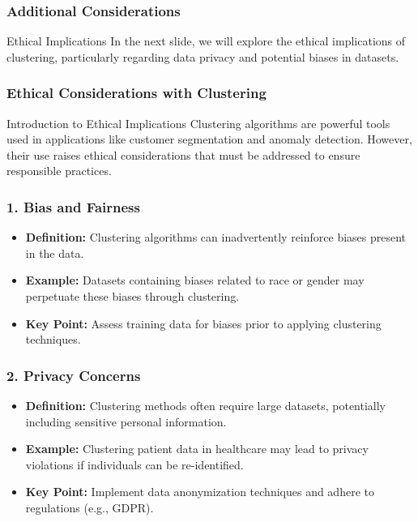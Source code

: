 \documentclass[aspectratio=169]{beamer}
\begin{document}
\begin{frame}[fragile]
    \frametitle{Additional Considerations}
    \begin{block}{Ethical Implications}
        In the next slide, we will explore the ethical implications of clustering, particularly regarding data privacy and potential biases in datasets.
    \end{block}
\end{frame}

\begin{frame}[fragile]
    \frametitle{Ethical Considerations with Clustering}
    \begin{block}{Introduction to Ethical Implications}
        Clustering algorithms are powerful tools used in applications like customer segmentation and anomaly detection. 
        However, their use raises ethical considerations that must be addressed to ensure responsible practices.
    \end{block}
\end{frame}

\begin{frame}[fragile]
    \frametitle{1. Bias and Fairness}
    \begin{itemize}
        \item \textbf{Definition:} Clustering algorithms can inadvertently reinforce biases present in the data.
        \item \textbf{Example:} Datasets containing biases related to race or gender may perpetuate these biases through clustering.
        \item \textbf{Key Point:} Assess training data for biases prior to applying clustering techniques.
    \end{itemize}
\end{frame}

\begin{frame}[fragile]
    \frametitle{2. Privacy Concerns}
    \begin{itemize}
        \item \textbf{Definition:} Clustering methods often require large datasets, potentially including sensitive personal information.
        \item \textbf{Example:} Clustering patient data in healthcare may lead to privacy violations if individuals can be re-identified.
        \item \textbf{Key Point:} Implement data anonymization techniques and adhere to regulations (e.g., GDPR).
    \end{itemize}
\end{frame}
\end{document}

